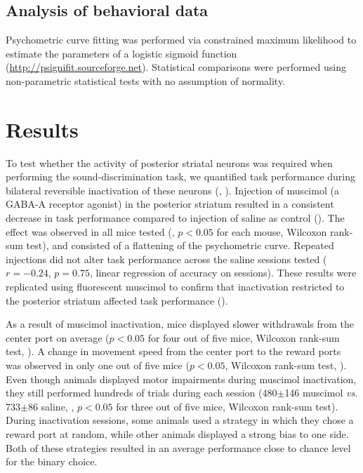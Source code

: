 \subsection{Analysis of behavioral data}

Psychometric curve fitting was performed via constrained maximum likelihood to estimate the parameters of a logistic sigmoid function (\url{http://psignifit.sourceforge.net}). Statistical comparisons were performed using non-parametric statistical tests with no assumption of normality. 

\section{Results}

To test whether the activity of posterior striatal neurons was required when performing the sound-discrimination task, we quantified task performance during bilateral reversible inactivation of  these neurons (\fig{\Muscimol}, \fig{\MuscimolSites}).
%
Injection of muscimol (a GABA-A receptor agonist) in the posterior striatum resulted in a consistent decrease in task performance compared to injection of saline as control (\fig{\MuscimolExample}).
%
The effect was observed in all mice tested (\fig{\MuscimolSummary}, $p<0.05$ for each mouse, Wilcoxon rank-sum test), and consisted of a flattening of the psychometric curve.
%
Repeated injections did not alter task performance across the saline sessions tested ($r=-0.24$, $p=0.75$, linear regression of accuracy on sessions).
%
These results were replicated using fluorescent muscimol to confirm that inactivation restricted to the posterior striatum affected task performance (\fig{\FluorescentMuscimol}).


%
As a result of muscimol inactivation, mice displayed slower withdrawals from the center port on average ($p<0.05$ for four out of five mice, Wilcoxon rank-sum test, \fig{\MuscimolCoutTime}).
%
A change in movement speed from the center port to the reward ports was observed in only one out of five mice ($p<0.05$, Wilcoxon rank-sum test, \fig{\MuscimolSideInTime}).
%
Even though animals displayed motor impairments during muscimol inactivation, they still performed hundreds of trials during each session (480$\pm$146 muscimol \emph{vs.} 733$\pm$86 saline, \fig{\MuscimolNumTrials}, $p<0.05$ for three out of five mice, Wilcoxon rank-sum test).
%
During inactivation sessions, some animals used a strategy in which they chose a reward port at random, while other animals displayed a strong bias to one side.
%
Both of these strategies resulted in an average performance close to chance level for the binary choice.

